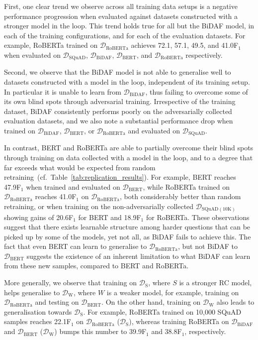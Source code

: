 \documentclass[11pt,a4paper]{article}
\newcommand{\dataset}[1]{\ensuremath{\mathcal{D_{\mathrm{#1}}}}}
\newcommand{\squad}{SQuAD}
\begin{document}
First, one clear trend we observe across all training data setups is a negative performance progression when evaluated against datasets constructed with a stronger model in the loop.
This trend holds true for all but the BiDAF model, in each of the training configurations, and for each of the evaluation datasets. 
For example, RoBERTa trained on \dataset{RoBERTa} achieves 72.1, 57.1, 49.5, and 41.0F$_\text{1}$ when evaluated on \dataset{SQuAD}, \dataset{BiDAF}, \dataset{BERT}, and \dataset{RoBERTa} respectively.


Second, we observe that the BiDAF model is not able to generalise well to datasets constructed with a model in the loop, independent of its training setup.
In particular it is unable to learn from \dataset{BiDAF}, thus failing to overcome some of its own blind spots through adversarial training.
Irrespective of the training dataset, BiDAF consistently performs poorly on the adversarially collected evaluation datasets, and we also note a substantial performance drop when trained on \dataset{BiDAF}, \dataset{BERT}, or \dataset{RoBERTa} and evaluated on \dataset{SQuAD}.


In contrast, BERT and RoBERTa are able to partially overcome their blind spots through training on data collected with a model in the loop, and to a degree that far exceeds what would be expected from random retraining~(cf.~Table~\ref{tab:replication_results}).
For example, BERT reaches 47.9F$_\text{1}$ when trained and evaluated on \dataset{BERT}, while RoBERTa trained on \dataset{RoBERTa} reaches 41.0F$_\text{1}$ on \dataset{RoBERTa}, both considerably better than random retraining, or when training on the non-adversarially collected \dataset{SQuAD(10K)} showing gains of 20.6F$_\text{1}$ for BERT and 18.9F$_\text{1}$ for RoBERTa.
These observations suggest that there exists learnable structure among harder questions that can be picked up by some of the models, yet not all, as BiDAF fails to achieve this.
The fact that even BERT can learn to generalise to \dataset{RoBERTa}, but not BiDAF to \dataset{BERT} suggests the existence of an inherent limitation to what BiDAF can learn from these new samples, compared to BERT and RoBERTa.


More generally, we observe that training on \dataset{S}, where $S$ is a stronger RC model, helps generalise to \dataset{W}, where $W$ is a weaker model, for example, training on \dataset{RoBERTa} and testing on \dataset{BERT}.
On the other hand, training on \dataset{W} also leads to generalisation towards \dataset{S}. 
For example, RoBERTa trained on 10,000 \squad{} samples reaches 22.1F$_\text{1}$ on \dataset{RoBERTa} (\dataset{S}), whereas training RoBERTa on \dataset{BiDAF} and \dataset{BERT} (\dataset{W}) bumps this number to 39.9F$_\text{1}$ and 38.8F$_\text{1}$, respectively.
\end{document}
